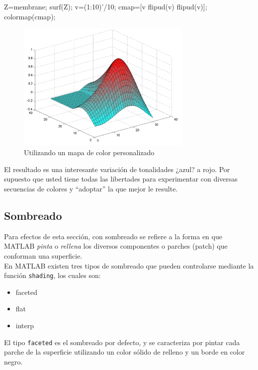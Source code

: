 \begin{matlab}
Z=membrane;
surf(Z);
v=(1:10)'/10;
cmap=[v flipud(v) flipud(v)];
colormap(cmap);
\end{matlab}

\begin{figure}[htbp]
    \centering
    \includegraphics[width=0.75\textwidth]{images/ch4/img_4_11.png}
    \caption{Utilizando un mapa de color personalizado}
    \label{fig:img_4_11}
\end{figure}

El resultado es una interesante variación de tonalidades ¿azul? a rojo.
Por supuesto que usted tiene todas las libertades para experimentar con
diversas secuencias de colores y ``adoptar'' la que mejor le resulte.

\subsection{Sombreado}

Para efectos de esta sección, con sombreado se refiere a la forma en que
MATLAB \emph{pinta} o \emph{rellena} los diversos componentes o parches
(patch) que conforman una superficie. \\

En MATLAB existen tres tipos de sombreado que pueden controlarse
mediante la función \texttt{shading}, los cuales son:

\begin{itemize}
\tightlist
\item
  faceted
\item
  flat
\item
  interp
\end{itemize}

El tipo \texttt{faceted} es el sombreado por defecto, y se caracteriza
por pintar cada parche de la superficie utilizando un color sólido de
relleno y un borde en color negro. \\

